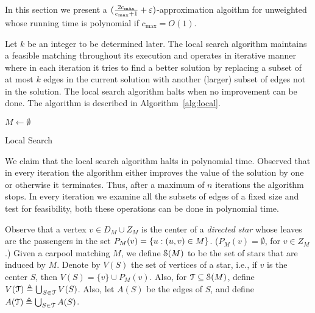
In this section we present a $(\frac{2c_{\max}}{c_{\max} + 1}
+ \varepsilon)$-approximation algoithm for unweighted \carpool whose running
time is polynomial if $c_{\max} = O(1)$.

Let $k$ be an integer to be determined later.  The local search
algorithm maintains a feasible matching throughout its execution and
operates in iterative manner where in each iteration it tries to find
a better solution by replacing a subset of at most $k$ edges in the
current solution with another (larger) subset of edges not in the
solution.  The local search algorithm halts when no improvement can be
done.  The algorithm is described in Algorithm~\ref{alg:local}.

\begin{algorithm}
$M \leftarrow \emptyset$								\\

\caption{Local Search}
\label{alg:local}
\end{algorithm}


We claim that the local search algorithm halts in polynomial time.
Observed that in every iteration the algorithm either improves the
value of the solution by one or otherwise it terminates.  Thus, after
a maximum of $n$ iterations the algorithm stops.  In every iteration
we examine all the subsets of edges of a fixed size and test for
feasibility, both these operations can be done in polynomial time.

Observe that a vertex $v \in D_M \cup Z_M$ is the center of
a \emph{directed star} whose leaves are the passengers in the set
$P_M(v) = \left\{ u : (u,v) \in M \right\}$.  ($P_M(v) = \emptyset$, for $v \in
Z_M$.)
%
Given a carpool matching $M$, we define $\mathcal{S}(M)$ to be the set of
stars that are induced by $M$.  Denote by $V(S)$ the set of vertices
of a star, i.e., if $v$ is the center $S$, then $V(S) = \{v\} \cup
P_M(v)$.  Also, for $\mathcal{T} \subseteq \mathcal{S}(M)$, define
$V(\mathcal{T}) \triangleq \bigcup_{S \in \mathcal{T}} V(S)$.  Also, let $A(S)$ be the
edges of $S$, and define $A(\mathcal{T}) \triangleq \bigcup_{S \in \mathcal{T}} A(S)$.

